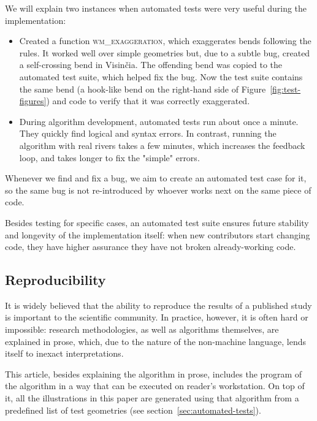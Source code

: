 \documentclass[a4paper]{article}
\begin{document}
We will explain two instances when automated tests were very useful during
the implementation:
\begin{itemize}

    \item Created a function \textsc{wm\_exaggeration}, which exaggerates bends
        following the rules. It worked well over simple geometries but, due to
        a subtle bug, created a self-crossing bend in Visinčia. The offending
        bend was copied to the automated test suite, which helped fix the bug.
        Now the test suite contains the same bend (a hook-like bend on the
        right-hand side of Figure~\ref{fig:test-figures}) and code to verify
        that it was correctly exaggerated.

    \item During algorithm development, automated tests run about once a
        minute. They quickly find logical and syntax errors. In contrast,
        running the algorithm with real rivers takes a few minutes, which
        increases the feedback loop, and takes longer to fix the "simple"
        errors.

\end{itemize}

Whenever we find and fix a bug, we aim to create an automated test case for it,
so the same bug is not re-introduced by whoever works next on the same piece of
code.

Besides testing for specific cases, an automated test suite ensures future
stability and longevity of the implementation itself: when new contributors
start changing code, they have higher assurance they have not broken
already-working code.

\subsection{Reproducibility}
\label{sec:reproducing-the-paper}

It is widely believed that the ability to reproduce the results of a published
study is important to the scientific community. In practice, however, it is
often hard or impossible: research methodologies, as well as algorithms
themselves, are explained in prose, which, due to the nature of the non-machine
language, lends itself to inexact interpretations.

This article, besides explaining the algorithm in prose, includes the program
of the algorithm in a way that can be executed on reader's workstation. On top
of it, all the illustrations in this paper are generated using that algorithm
from a predefined list of test geometries (see
section~\ref{sec:automated-tests}).
\end{document}
